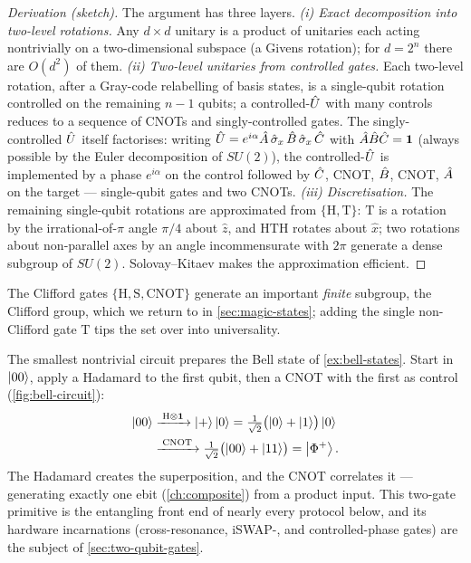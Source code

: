 \begin{proof}[Derivation (sketch)]
The argument has three layers. \emph{(i) Exact decomposition into
two-level rotations.} Any $d\times d$ unitary is a product of unitaries
each acting nontrivially on a two-dimensional subspace (a Givens
rotation); for $d=2^n$ there are $O(d^2)$ of them. \emph{(ii) Two-level
unitaries from controlled gates.} Each two-level rotation, after a Gray-code
relabelling of basis states, is a single-qubit rotation controlled on
the remaining $n-1$ qubits; a controlled-$\hat{U}$ with many controls
reduces to a sequence of CNOTs and singly-controlled gates. The
singly-controlled $\hat{U}$ itself factorises: writing
$\hat{U}=e^{i\alpha}\hat{A}\,\hat\sigma_x\,\hat{B}\,\hat\sigma_x\,\hat{C}$ with
$\hat{A}\hat{B}\hat{C}=\mathbf{1}$ (always possible by the Euler decomposition of
$SU(2)$), the controlled-$\hat{U}$ is implemented by a phase $e^{i\alpha}$
on the control followed by $\hat{C}$, CNOT, $\hat{B}$, CNOT, $\hat{A}$ on the
target --- single-qubit gates and two CNOTs. \emph{(iii)
Discretisation.} The remaining single-qubit rotations are approximated
from $\{\mathrm{H},\mathrm{T}\}$: $\mathrm{T}$ is a rotation by the
irrational-of-$\pi$ angle $\pi/4$ about $\hat z$, and
$\mathrm{H}\mathrm{T}\mathrm{H}$ rotates about $\hat x$; two rotations
about non-parallel axes by an angle incommensurate with $2\pi$ generate
a dense subgroup of $SU(2)$. Solovay--Kitaev makes the approximation
efficient.
\end{proof}

The Clifford gates $\{\mathrm{H},\mathrm{S},\mathrm{CNOT}\}$ generate an
important \emph{finite} subgroup, the Clifford group, which we return to
in \cref{sec:magic-states}; adding the single non-Clifford gate
$\mathrm{T}$ tips the set over into universality.

\begin{example}
\label{ex:bell-circuit}
The smallest nontrivial circuit prepares the Bell state of
\cref{ex:bell-states}. Start in $\ket{00}$, apply a Hadamard to the
first qubit, then a CNOT with the first as control (\cref{fig:bell-circuit}):
\begin{align}
\ket{00}
&\xrightarrow{\;\mathrm{H}\otimes\mathbf{1}\;}
\ket{+}\ket{0}
=\tfrac{1}{\sqrt2}\bigl(\ket{0}+\ket{1}\bigr)\ket{0}\\
&\xrightarrow{\;\mathrm{CNOT}\;}
\tfrac{1}{\sqrt2}\bigl(\ket{00}+\ket{11}\bigr)=\ket{\Phi^+}.
\end{align}
The Hadamard creates the superposition, and the CNOT correlates it ---
generating exactly one ebit (\cref{ch:composite}) from a product input.
This two-gate primitive is the entangling front end of nearly every
protocol below, and its hardware incarnations (cross-resonance, iSWAP-,
and controlled-phase gates) are the subject of
\cref{sec:two-qubit-gates}.
\end{example}

